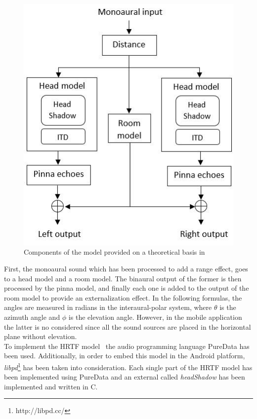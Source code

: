 \documentclass[journal]{IEEEtran}
\begin{document}
\begin{figure}[h!]
	\centering
		\includegraphics[scale=0.55]{graphics/graphic.jpg}
	\caption{Components of the model provided on a theoretical basis in~\cite{Brown1997}}
	\label{fig:workflow}
\end{figure}

First, the monoaural sound which has been processed to add a range effect, goes to a head model and a room model. The binaural output of the former is then processed by the pinna model, and finally each one is added to the output of the room model to provide an externalization effect. In the following formulas, the angles are measured in radians in the interaural-polar system, where $\theta$ is the azimuth angle and $\phi$ is the elevation angle. However, in the mobile application the latter is no considered since all the sound sources are placed in the horizontal plane without elevation. \\

To implement the HRTF model~\cite{Brown1997} the audio programming language PureData has been used. Additionally, in order to embed this model in the Android platform, \textit{libpd}\footnote{http://libpd.cc/} has been taken into consideration. Each single part of the HRTF model has been implemented using PureData and an       external called \textit{headShadow} has been implemented and written in C. 
\end{document}
